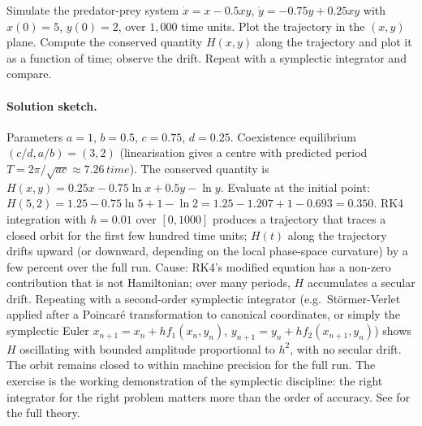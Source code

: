 \begin{exercise}
Simulate the predator-prey system $\dot{x} = x - 0.5 x y$,
$\dot{y} = -0.75 y + 0.25 x y$ with $x(0) = 5$, $y(0) = 2$, over
$1{,}000$ time units. Plot the trajectory in the $(x, y)$ plane.
Compute the conserved quantity $H(x, y)$ along the trajectory and
plot it as a function of time; observe the drift. Repeat with a
symplectic integrator and compare.

\paragraph{Solution sketch.} Parameters $a = 1$, $b = 0.5$, $c =
0.75$, $d = 0.25$. Coexistence equilibrium $(c/d, a/b) = (3, 2)$
(linearisation gives a centre with predicted period $T = 2\pi/
\sqrt{a c} \approx 7.26\,\si{\unit{time}}$). The conserved
quantity is $H(x, y) = 0.25 x - 0.75 \ln x + 0.5 y - \ln y$.
Evaluate at the initial point: $H(5, 2) = 1.25 - 0.75 \ln 5 + 1
- \ln 2 = 1.25 - 1.207 + 1 - 0.693 = 0.350$. RK4 integration
with $h = 0.01$ over $[0, 1000]$ produces a trajectory that
traces a closed orbit for the first few hundred time units;
$H(t)$ along the trajectory drifts upward (or downward,
depending on the local phase-space curvature) by a few percent
over the full run. Cause: RK4's modified equation has a
non-zero contribution that is not Hamiltonian; over many
periods, $H$ accumulates a secular drift. Repeating with a
second-order symplectic integrator (e.g.\ St\"ormer-Verlet
applied after a Poincar\'e transformation to canonical
coordinates, or simply the symplectic Euler $x_{n+1} = x_{n} +
h f_{1}(x_{n}, y_{n})$, $y_{n+1} = y_{n} + h f_{2}(x_{n+1},
y_{n})$) shows $H$ oscillating with bounded amplitude
proportional to $h^{2}$, with no secular drift. The orbit
remains closed to within machine precision for the full run.
The exercise is the working demonstration of the symplectic
discipline: the right integrator for the right problem matters
more than the order of accuracy. See
\cite{text:v2ch07-hairer-lubich-wanner-geometric} for the full
theory.
\end{exercise}

